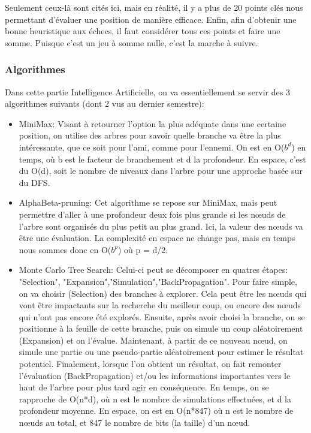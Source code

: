 \documentclass{article}
\begin{document}
Seulement ceux-là sont cités ici, mais en réalité, il y a plus de 20 points clés nous permettant d'évaluer une position de manière efficace.
Enfin, afin d'obtenir une bonne heuristique aux échecs, il faut considérer tous ces points et faire une somme. Puisque c'est un jeu à somme nulle,
c'est la marche à suivre. 

\subsubsection{Algorithmes}
Dans cette partie Intelligence Artificielle, on va essentiellement se servir des 3 algorithmes suivants (dont 2 vus au dernier semestre):
\begin{itemize}
    \item MiniMax: Visant à retourner l'option la plus adéquate dans une certaine position, on utilise des arbres pour savoir quelle branche va être la
    plus intéressante, que ce soit pour l'ami, comme pour l'ennemi. On est en O($b^d$) en temps, où b est le facteur de branchement et d la profondeur.
    En espace, c'est du O(d), soit le nombre de niveaux dans l'arbre pour une approche basée sur du DFS.
    \item AlphaBeta-pruning: Cet algorithme se repose sur MiniMax, mais peut permettre d'aller à une profondeur deux fois plus grande si les nœuds de
    l'arbre sont organisés du plus petit au plus grand. Ici, la valeur des nœuds va être une évaluation. La complexité en espace ne change pas, mais
    en temps nous sommes donc en O($b^p$) où p = d/2.
    \item Monte Carlo Tree Search: Celui-ci peut se décomposer en quatres étapes: "Selection",
    "Expansion","Simulation","BackPropagation". Pour faire simple,
    on va choisir (Selection) des branches à explorer. Cela peut être les nœuds qui vont être impactants sur la recherche du meilleur coup,
    ou encore des nœuds qui n'ont pas encore été explorés. Ensuite, après avoir choisi la branche, on se positionne à la feuille de cette branche,
    puis on simule un coup aléatoirement (Expansion) et on l'évalue. Maintenant, à partir de ce nouveau nœud, on simule une partie ou une pseudo-partie
    aléatoirement pour estimer le résultat potentiel. Finalement, lorsque l'on obtient un résultat, on fait remonter l'évaluation (BackPropagation)
    et/ou les informations importantes vers le haut de l'arbre pour plus tard agir en conséquence. En temps, on se rapproche de O(n*d), où n est le
    nombre de simulations effectuées, et d la profondeur moyenne. En espace, on est en O(n*847) où n est le nombre de nœuds au total, et 847 le
    nombre de bits (la taille) d'un nœud.
\end{itemize}
\end{document}

